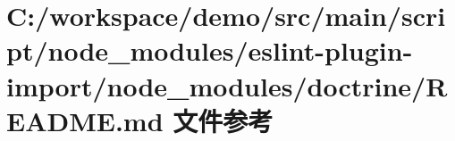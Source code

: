 \hypertarget{node__modules_2eslint-plugin-import_2node__modules_2doctrine_2_r_e_a_d_m_e_8md}{}\section{C\+:/workspace/demo/src/main/script/node\+\_\+modules/eslint-\/plugin-\/import/node\+\_\+modules/doctrine/\+R\+E\+A\+D\+ME.md 文件参考}
\label{node__modules_2eslint-plugin-import_2node__modules_2doctrine_2_r_e_a_d_m_e_8md}
